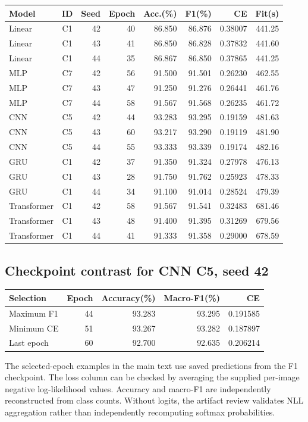 \begin{center}
\small
\begin{tabular}{lcrrrrrr}
\toprule
Model & ID & Seed & Epoch & Acc.(\%) & F1(\%) & CE & Fit(s) \\
\midrule
Linear & C1 & 42 & 40 & 86.850 & 86.876 & 0.38007 & 441.25 \\
Linear & C1 & 43 & 41 & 86.850 & 86.828 & 0.37832 & 441.60 \\
Linear & C1 & 44 & 35 & 86.867 & 86.850 & 0.37865 & 441.25 \\
MLP & C7 & 42 & 56 & 91.500 & 91.501 & 0.26230 & 462.55 \\
MLP & C7 & 43 & 47 & 91.250 & 91.276 & 0.26441 & 461.76 \\
MLP & C7 & 44 & 58 & 91.567 & 91.568 & 0.26235 & 461.72 \\
CNN & C5 & 42 & 44 & 93.283 & 93.295 & 0.19159 & 481.63 \\
CNN & C5 & 43 & 60 & 93.217 & 93.290 & 0.19119 & 481.90 \\
CNN & C5 & 44 & 55 & 93.333 & 93.339 & 0.19174 & 482.16 \\
GRU & C1 & 42 & 37 & 91.350 & 91.324 & 0.27978 & 476.13 \\
GRU & C1 & 43 & 28 & 91.750 & 91.762 & 0.25923 & 478.33 \\
GRU & C1 & 44 & 34 & 91.100 & 91.014 & 0.28524 & 479.39 \\
Transformer & C1 & 42 & 58 & 91.567 & 91.541 & 0.32483 & 681.46 \\
Transformer & C1 & 43 & 48 & 91.400 & 91.395 & 0.31269 & 679.56 \\
Transformer & C1 & 44 & 41 & 91.333 & 91.358 & 0.29000 & 678.59 \\
\bottomrule
\end{tabular}
\end{center}
\subsection{Checkpoint contrast for CNN C5, seed 42}

\begin{center}
\small
\begin{tabular}{lrrrr}
\toprule
Selection & Epoch & Accuracy(\%) & Macro-F1(\%) & CE \\
\midrule
Maximum F1 & 44 & 93.283 & 93.295 & 0.191585 \\
Minimum CE & 51 & 93.267 & 93.282 & 0.187897 \\
Last epoch & 60 & 92.700 & 92.635 & 0.206214 \\
\bottomrule
\end{tabular}
\end{center}
The selected-epoch examples in the main text use saved predictions from the F1 checkpoint. The loss column can be checked by averaging the supplied per-image negative log-likelihood values. Accuracy and macro-F1 are independently reconstructed from class counts. Without logits, the artifact review validates NLL aggregation rather than independently recomputing softmax probabilities.

